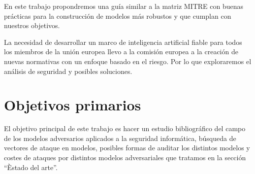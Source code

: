 En este trabajo propondremos una guía similar a la matriz \gls{MITRE} con buenas prácticas para la construcción de modelos más robustos y que cumplan con nuestros objetivos.

La necesidad de desarrollar un marco de inteligencia artificial fiable para todos los miembros de la unión europea llevo a la comisión europea a la creación de nuevas normativas con un enfoque basado en el riesgo.
Por lo que exploraremos el análisis de seguridad y posibles soluciones.


\section{Objetivos primarios}



El objetivo principal de este trabajo es hacer un estudio bibliográfico del campo de los modelos adversarios aplicados a la seguridad informática, búsqueda de vectores de ataque en modelos, posibles formas de auditar los distintos modelos y costes de ataques por distintos modelos adversariales que tratamos en la sección ``Èstado del arte''.


